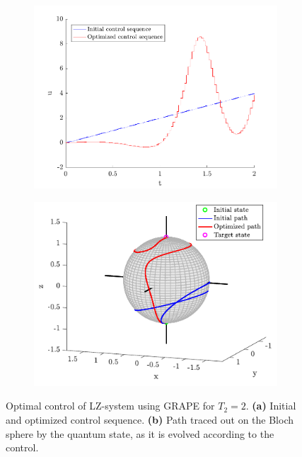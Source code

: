 \begin{figure}[h!]
\centering %
\begin{subfigure}[b]{0.48\textwidth}
	\caption{}  
  	\includegraphics[width=\textwidth]{Figures/LZcontrol2.pdf}
\end{subfigure}
\hspace{3mm}
\begin{subfigure}[b]{0.48\textwidth}
	\caption{}    
  	\includegraphics[width=\textwidth]{Figures/LZpath2.pdf}
\end{subfigure}

\caption{Optimal control of LZ-system using GRAPE for $T_2 = 2$. \textbf{(a)} Initial and optimized control sequence. \textbf{(b)} Path traced out on the Bloch sphere by the quantum state, as it is evolved according to the control.}
\label{fig:LZopt2}
\end{figure}
